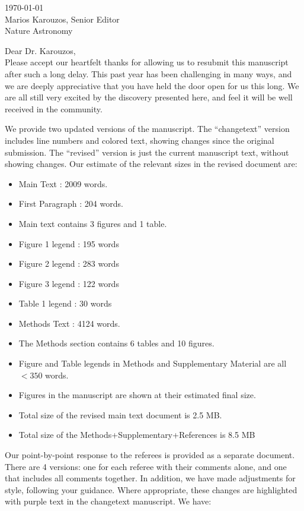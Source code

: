 \documentclass[11pt]{article}
\begin{document}
\noindent \today\\[2em]
Marios Karouzos, Senior Editor\\
Nature Astronomy\\

\bigskip

\noindent Dear Dr. Karouzos, \\

Please accept our heartfelt thanks for allowing us to resubmit this manuscript after such a long delay.  This past year has been challenging in many ways, and we are deeply appreciative that you have held the door open for us this long.  We are all still very excited by the discovery presented here, and feel it will be well received in the community.  

We provide two updated versions of the manuscript.  The ``changetext'' version includes line numbers and colored text, showing changes since the original submission.  The ``revised'' version is just the current manuscript text, without showing changes.  Our estimate of the relevant sizes in the revised document are:

\begin{itemize}
    \item Main Text : 2009 words.
    \item First Paragraph : 204 words.
    \item Main text contains 3 figures and 1 table.
    \item Figure 1 legend : 195 words
    \item Figure 2 legend : 283 words
    \item Figure 3 legend : 122 words
    \item Table 1 legend : 30 words
    \item Methods Text :  4124 words.
    \item The Methods section contains 6 tables and 10 figures.
    \item Figure and Table legends in Methods and Supplementary Material are all $<350$ words.  
    \item Figures in the manuscript are shown at their estimated final size.
    \item Total size of the revised main text document is 2.5 MB.
    \item Total size of the Methods+Supplementary+References is 8.5 MB
\end{itemize}


Our point-by-point response to the referees is provided as a separate document.  There are 4 versions: one for each referee with their comments alone, and one that includes all comments together. In addition, we have made adjustments for style, following your guidance.  Where appropriate, these changes are highlighted with purple text in the changetext manuscript.  We have:
\end{document}
